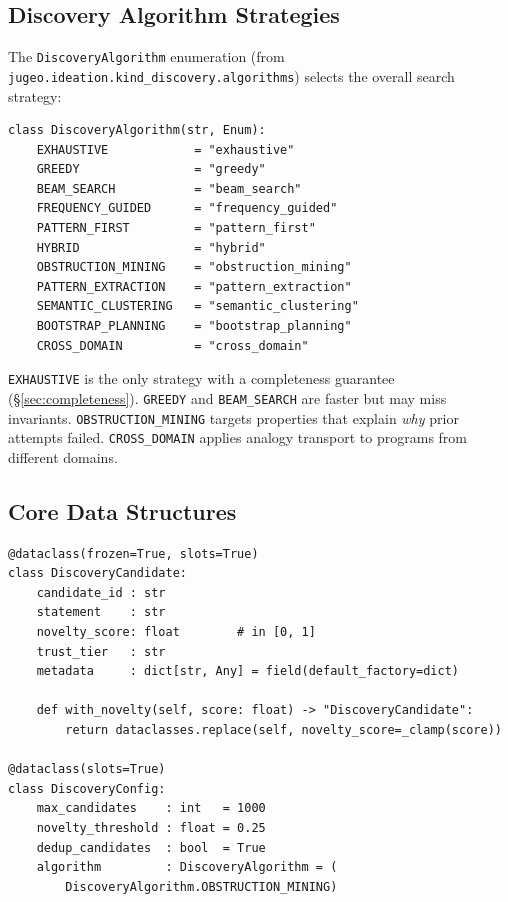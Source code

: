 \documentclass[11pt]{article}
\newcommand{\alg}[1]{\texttt{\small #1}}   %
\begin{document}
\subsection{Discovery Algorithm Strategies}

The \alg{DiscoveryAlgorithm} enumeration (from
\texttt{jugeo.ideation.kind\_discovery.algorithms}) selects the
overall search strategy:

\begin{lstlisting}[style=jugeo-python, caption={%
  Discovery strategy enumeration (DiscoveryAlgorithm).}]
class DiscoveryAlgorithm(str, Enum):
    EXHAUSTIVE            = "exhaustive"
    GREEDY                = "greedy"
    BEAM_SEARCH           = "beam_search"
    FREQUENCY_GUIDED      = "frequency_guided"
    PATTERN_FIRST         = "pattern_first"
    HYBRID                = "hybrid"
    OBSTRUCTION_MINING    = "obstruction_mining"
    PATTERN_EXTRACTION    = "pattern_extraction"
    SEMANTIC_CLUSTERING   = "semantic_clustering"
    BOOTSTRAP_PLANNING    = "bootstrap_planning"
    CROSS_DOMAIN          = "cross_domain"
\end{lstlisting}

\alg{EXHAUSTIVE} is the only strategy with a completeness guarantee
(\S\ref{sec:completeness}).  \alg{GREEDY} and \alg{BEAM\_SEARCH}
are faster but may miss invariants.  \alg{OBSTRUCTION\_MINING}
targets properties that explain \emph{why} prior attempts failed.
\alg{CROSS\_DOMAIN} applies analogy transport to programs from
different domains.

\subsection{Core Data Structures}

\begin{lstlisting}[style=jugeo-python, caption={%
  Core candidate and config data structures.}]
@dataclass(frozen=True, slots=True)
class DiscoveryCandidate:
    candidate_id : str
    statement    : str
    novelty_score: float        # in [0, 1]
    trust_tier   : str
    metadata     : dict[str, Any] = field(default_factory=dict)

    def with_novelty(self, score: float) -> "DiscoveryCandidate":
        return dataclasses.replace(self, novelty_score=_clamp(score))

@dataclass(slots=True)
class DiscoveryConfig:
    max_candidates    : int   = 1000
    novelty_threshold : float = 0.25
    dedup_candidates  : bool  = True
    algorithm         : DiscoveryAlgorithm = (
        DiscoveryAlgorithm.OBSTRUCTION_MINING)
\end{lstlisting}
\end{document}

